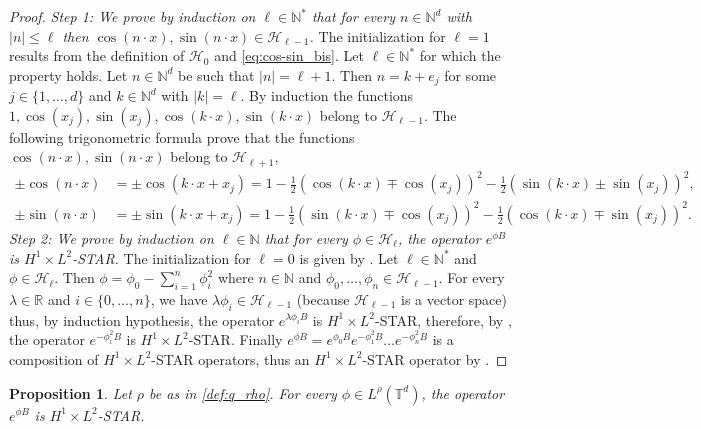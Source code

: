 \documentclass[a4paper]{article}
\theoremstyle{plain}
\newtheorem{proposition}[theorem]{Proposition}
\newcommand{\T}{\mathbb{T}}
\begin{document}
\begin{proof}
\emph{Step 1: We prove by induction on $\ell \in \mathbb{N}^*$ that for every $n \in \mathbb{N}^d$ with $|n| \leq \ell$ then $\cos(n\cdot x),\sin(n\cdot x) \in \mathcal{H}_{\ell-1}$.} The initialization for $\ell=1$ results from the definition of $\mathcal{H}_0$ and \eqref{eq:cos-sin_bis}. Let $\ell \in \mathbb{N}^*$ for which the property holds.
Let $n \in \mathbb{N}^d$ be such that $|n|=\ell+1$. Then $n=k+e_j$ for some $j \in \{1,\dots,d\}$ and $k \in \mathbb{N}^d$ with $|k|=\ell$. By induction the functions $1, \cos(x_j), \sin(x_j), \cos(k\cdot x), \sin(k\cdot x)$  belong to $\mathcal{H}_{\ell-1}$. The following trigonometric formula prove that the functions $\cos(n\cdot x), \sin(n\cdot x)$ belong to $\mathcal{H}_{\ell+1}$,
$$\begin{aligned}
\pm \cos(n\cdot x) & =\pm \cos(k\cdot x + x_j) =
1- \frac{1}{2} \left(\cos(k\cdot x)\mp\cos(x_j) \right)^2
- \frac{1}{2} \left(\sin(k\cdot x)\pm\sin(x_j) \right)^2,
\\
\pm \sin(n\cdot x) & =\pm \sin(k\cdot x + x_j )=1
-\frac{1}{2} \left(\sin(k\cdot x) \mp \cos(x_j) \right)^2 
-\frac{1}{2} \left(\cos(k\cdot x) \mp \sin(x_j) \right)^2.
\end{aligned}$$
\noindent \emph{Step 2: We prove by induction on $\ell \in \mathbb{N}$ that for every $\phi \in \mathcal{H}_{\ell}$, the operator $e^{\phi B}$ is $H^1 \times L^2$-STAR.} The initialization for $\ell=0$ is given by . Let $\ell \in \mathbb{N}^*$ and $\phi \in \mathcal{H}_{\ell}$. Then $\phi=\phi_0 - \sum_{i=1}^n \phi_i^2$ where $n \in\mathbb{N}$ and $\phi_0,\dots,\phi_n\in\mathcal{H}_{\ell-1}$.  For every $\lambda \in \mathbb{R}$ and $i \in \{0,\dots,n\}$, we have $\lambda \phi_i \in \mathcal{H}_{\ell-1}$ (because $\mathcal{H}_{\ell-1}$ is a vector space)
thus, by induction hypothesis, the operator $e^{\lambda \phi_i B}$ is $H^1 \times L^2$-STAR, therefore, by , the operator $e^{-\phi_i^2 B}$ is $H^1 \times L^2$-STAR. Finally 
$e^{\phi B}=e^{\phi_0 B} e^{-\phi_1^2 B} \dots e^{-\phi_n^2 B}$
is a composition of $H^1 \times L^2$-STAR operators, thus an $H^1 \times L^2$-STAR operator by .
\end{proof}


\begin{proposition} \label{lem_psi}
Let $\rho$ be as in \eqref{def:q_rho}.
For every $\phi \in L^{\rho}(\T^d)$, the operator $e^{\phi B}$ is $H^1 \times L^2$-STAR. 
\end{proposition}
\end{document}
